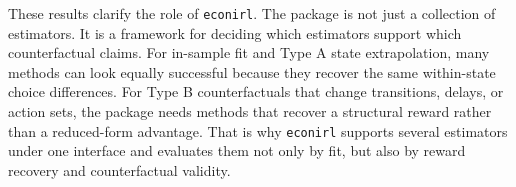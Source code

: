 \documentclass[11pt]{article}
\begin{document}
\begin{table}[H]
\centering
\small
\setlength{\tabcolsep}{4pt}
\caption{Summary of the six method variants considered in the appendix.}
\label{tab:summary}
\end{table}

These results clarify the role of \texttt{econirl}. The package is not just a collection of estimators. It is a framework for deciding which estimators support which counterfactual claims. For in-sample fit and Type A state extrapolation, many methods can look equally successful because they recover the same within-state choice differences. For Type B counterfactuals that change transitions, delays, or action sets, the package needs methods that recover a structural reward rather than a reduced-form advantage. That is why \texttt{econirl} supports several estimators under one interface and evaluates them not only by fit, but also by reward recovery and counterfactual validity.

\end{document}
